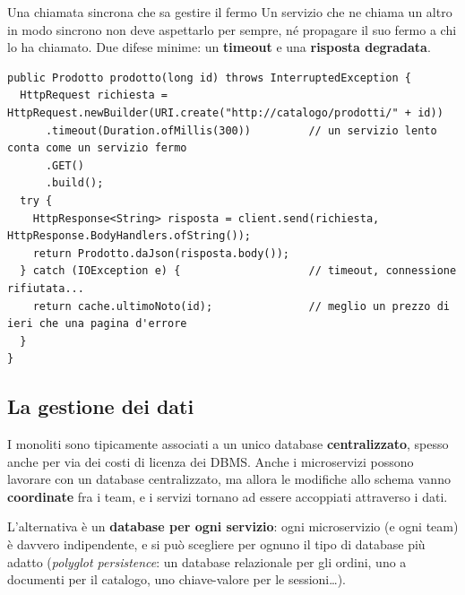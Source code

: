 \begin{esempio}{Una chiamata sincrona che sa gestire il fermo}
Un servizio che ne chiama un altro in modo sincrono non deve aspettarlo per sempre, né propagare il suo fermo a chi lo
ha chiamato. Due difese minime: un \textbf{timeout} e una \textbf{risposta degradata}.
\begin{lstlisting}[style=java, name=ClientCatalogo.java]
public Prodotto prodotto(long id) throws InterruptedException {
  HttpRequest richiesta = HttpRequest.newBuilder(URI.create("http://catalogo/prodotti/" + id))
      .timeout(Duration.ofMillis(300))         // un servizio lento conta come un servizio fermo
      .GET()
      .build();
  try {
    HttpResponse<String> risposta = client.send(richiesta, HttpResponse.BodyHandlers.ofString());
    return Prodotto.daJson(risposta.body());
  } catch (IOException e) {                    // timeout, connessione rifiutata...
    return cache.ultimoNoto(id);               // meglio un prezzo di ieri che una pagina d'errore
  }
}
\end{lstlisting}
\end{esempio}

\subsection{La gestione dei dati}

I monoliti sono tipicamente associati a un unico database \textbf{centralizzato}, spesso anche per via dei costi di licenza
dei DBMS. Anche i microservizi possono lavorare con un database centralizzato, ma allora le modifiche allo schema vanno
\textbf{coordinate} fra i team, e i servizi tornano ad essere accoppiati attraverso i dati.

L'alternativa è un \textbf{database per ogni servizio}: ogni microservizio (e ogni team) è davvero indipendente, e si può
scegliere per ognuno il tipo di database più adatto (\textit{polyglot persistence}: un database relazionale per gli ordini,
uno a documenti per il catalogo, uno chiave-valore per le sessioni\ldots).

